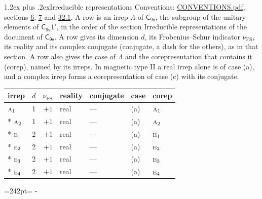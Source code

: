 \documentclass[10pt,a4paper]{article}
\makeatletter
\renewcommand\section{\@startsection{section}{1}{\z@}{-3ex plus -1ex minus -.2ex}%
  {1.2ex plus .2ex}{\normalfont\large\sffamily\bfseries\color{parttitle}}}
\newcommand{\needspace}[1]{\par\penalty-100\begingroup\dimen0=#1\relax\dimen2=\pagegoal
  \advance\dimen2-\pagetotal\ifdim\dimen0>\dimen2\relax\ifdim\dimen2>0pt\vfil\break\fi\fi
  \endgroup}
\numberwithin{equation}{section}
\newcommand{\grp}[1]{\mathsf{#1}}
\newcommand{\irr}[1]{\text{\normalfont\scshape #1}}
\newcommand{\fsind}{\nu_{\mathrm{FS}}}
\makeatother
\begin{document}
\section{Irreducible representations}\label{s:irreps}
Conventions: \href{../../CONVENTIONS.pdf}{CONVENTIONS.pdf}, sections \href{../../../rotation/CONVENTIONS.pdf\#conv.6}{6}, \href{../../../rotation/CONVENTIONS.pdf\#conv.7}{7} and \href{../../CONVENTIONS.pdf\#conv.32.1}{32.1}.
\leavevmode\label{n:irrep.Delta}A row is an irrep $\Lambda$ of $\grp{C_{9v}}$, the subgroup of the unitary elements of $\grp{C_{9v}1'}$, in the order of the section Irreducible representations of the document of \href{../../../rotation/data/pdf/C9v.pdf}{$\grp{C_{9v}}$}. \label{n:index.dimension}\label{n:index.frobenius}\label{n:head.irrep}\label{n:head.reality}\label{n:head.conjugate}A row gives its dimension $d$, its Frobenius--Schur indicator $\fsind$, its reality and its complex conjugate (conjugate, a dash for the others), as in that section. \label{n:head.case.corep}\label{n:head.corep}A row also gives the case of $\Lambda$ and the corepresentation that contains it (corep), named by its irreps. In magnetic type II a real irrep alone is of case (a), and a complex irrep forms a corepresentation of case (c) with its conjugate.
\setlength{\emergencystretch}{2em}\par\setlength{\emergencystretch}{0pt}
{\small\renewcommand{\arraystretch}{1.25}\setlength{\tabcolsep}{4pt}\begin{longtable}{@{}lrrllll@{}}\toprule
irrep & $d$ & $\fsind$ & reality & conjugate & case & corep\\\midrule\endhead
\bottomrule\endfoot\endlastfoot
$\irr{a}_{1}$ & 1 & $+1$ & real & --- & (a) & $\irr{a}_{1}$\\*
$\irr{a}_{2}$ & 1 & $+1$ & real & --- & (a) & $\irr{a}_{2}$\\*
$\irr{e}_{1}$ & 2 & $+1$ & real & --- & (a) & $\irr{e}_{1}$\\*
$\irr{e}_{2}$ & 2 & $+1$ & real & --- & (a) & $\irr{e}_{2}$\\*
$\irr{e}_{3}$ & 2 & $+1$ & real & --- & (a) & $\irr{e}_{3}$\\*
$\irr{e}_{4}$ & 2 & $+1$ & real & --- & (a) & $\irr{e}_{4}$\\
\bottomrule\end{longtable}}
\needspace{242pt}
\end{document}
